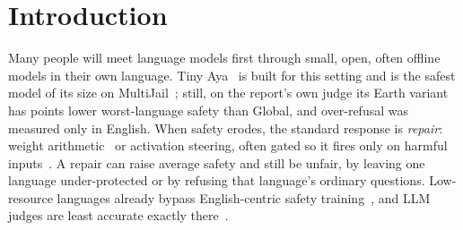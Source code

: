 \documentclass{article}
\begin{document}
\section{Introduction}
Many people will meet language models first through small, open, often offline models in their own language.
Tiny Aya~\citep{salamanca2026tinyaya} is built for this setting and is the safest model of its size on MultiJail~\citep{deng2024multijail}; still, on the report's own judge its Earth variant has \ReportMinSafeDrop{} points lower worst-language safety than Global, and over-refusal was measured only in English.
When safety erodes, the standard response is \emph{repair}: weight arithmetic~\citep{bhardwaj2024resta} or activation steering, often gated so it fires only on harmful inputs~\citep{arditi2024refusal,lee2025cast}.
A repair can raise average safety and still be unfair, by leaving one language under-protected or by refusing that language's ordinary questions.
Low-resource languages already bypass English-centric safety training~\citep{yong2023lowresource,deng2024multijail}, and LLM judges are least accurate exactly there~\citep{zhou2026lowerresource}.
\end{document}
